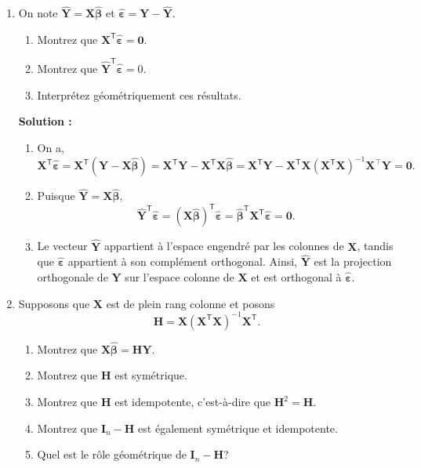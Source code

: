 \documentclass[letter, 11pt]{article}
\newcommand{\bY}{\mathbf{Y}}
\newcommand{\bX}{\mathbf{X}}
\newcommand{\bbeta}{\boldsymbol{\beta}}
\newcommand{\bepsilon}{\boldsymbol{\varepsilon}}
\newcommand{\bH}{\mathbf{H}}
\newcommand{\trans}{^{\mathsf T}}
\newcommand{\prof}[1]{\begin{professeur}\color{blue} {\bf Solution :} #1 \end{professeur}}
\begin{document}
\begin{enumerate}[leftmargin=*, wide, label=\bf Exercice \arabic*:]

\item On note $\widehat{\bY}=\bX\widehat{\bbeta}$ et
$\widehat{\bepsilon}=\bY-\widehat{\bY}$.

\begin{enumerate}[label=\alph*)]
  \item Montrez que
        $\bX\trans\widehat{\bepsilon}=\mathbf{0}$.
    \item Montrez que $\widehat{\bY}\trans\widehat{\bepsilon}=0$.
  \item Interprétez géométriquement ces résultats.
\end{enumerate}

\prof{
\begin{enumerate}[label=\alph*)]
  \item On a,
        \[
        \bX\trans\widehat{\bepsilon}
        =\bX\trans(\bY-\bX\widehat{\bbeta})
        =\bX\trans\bY-\bX\trans\bX\widehat{\bbeta}
        =\bX\trans\bY-\bX\trans\bX(\bX\trans\bX)^{-1}\bX^\top\bY
        =\mathbf{0}.
        \]

   \item Puisque $\widehat{\bY}=\bX\widehat{\bbeta}$,
        \[
        \widehat{\bY}\trans\widehat{\bepsilon}
        =(\bX\widehat{\bbeta})\trans\widehat{\bepsilon}
        =\widehat{\bbeta}\trans\bX\trans\widehat{\bepsilon}
        =\mathbf{0}.
        \]

  \item Le vecteur $\widehat{\bY}$ appartient à l'espace engendré par les
        colonnes de $\bX$, tandis que $\widehat{\bepsilon}$ appartient à son
        complément orthogonal. Ainsi, $\widehat{\bY}$ est la projection
        orthogonale de $\bY$ sur l'espace colonne de $\bX$ et est orthogonal à $\widehat{\bepsilon}$.
\end{enumerate}
}


\item Supposons que $\bX$ est de plein rang colonne et posons
\[
  \bH=\bX(\bX\trans\bX)^{-1}\bX\trans.
\]

\begin{enumerate}[label=\alph*)]
  \item Montrez que $\bX\widehat{\bbeta}=\bH\bY$.
  \item Montrez que $\bH$ est symétrique.
  \item Montrez que $\bH$ est idempotente, c'est-à-dire que
        $\bH^2=\bH$.
  \item Montrez que $\mathbf{I}_n-\bH$ est également symétrique et idempotente.
  \item Quel est le rôle géométrique de $\mathbf{I}_n-\bH$?
\end{enumerate}


\end{enumerate}
\end{document}
